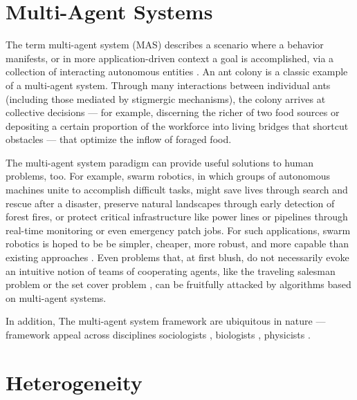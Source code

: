 \section{Multi-Agent Systems}

The term multi-agent system (MAS) describes a scenario where a behavior manifests, or in more application-driven context a goal is accomplished, via a collection of interacting autonomous entities \cite{ferber2003agents}.
An ant colony is a classic example of a multi-agent system.
Through many interactions between individual ants (including those mediated by stigmergic mechanisms), the colony arrives at collective decisions --- for example, discerning the richer of two food sources \cite{beckers1993modulation} or depositing a certain proportion of the workforce into living bridges that shortcut obstacles \cite{graham2017optimal} --- that optimize the inflow of foraged food.

The multi-agent system paradigm can provide useful solutions to human problems, too.
For example, swarm robotics, in which groups of autonomous machines unite to accomplish difficult tasks, might save lives through search and rescue after a disaster, preserve natural landscapes through early detection of forest fires, or protect critical infrastructure like power lines or pipelines through real-time monitoring or even emergency patch jobs.
For such applications, swarm robotics is hoped to be be simpler, cheaper, more robust, and more capable than existing approaches \cite{tan2013research}.
Even problems that, at first blush, do not necessarily evoke an intuitive notion of teams of cooperating agents, like the traveling salesman problem \cite{dorigo1997ant, bnasin2013applications} or the set cover problem \cite{rahoual2002parallel,ren2010new}, can be fruitfully attacked by algorithms based on multi-agent systems.

In addition,
The multi-agent system framework are ubiquitous in nature --- framework appeal across disciplines sociologists \cite{sawyer2003artificial}, biologists \cite{perna2012individual}, physicists \cite{vicsek1995novel}.


\section{Heterogeneity}

